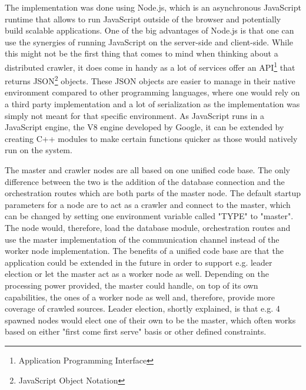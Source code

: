 The implementation was done using Node.js, which is an asynchronous JavaScript runtime that allows to run JavaScript outside of the browser and potentially build scalable applications. One of the big advantages of Node.js is that one can use the synergies of running JavaScript on the server-side and client-side. While this might not be the first thing that comes to mind when thinking about a distributed crawler, it does come in handy as a lot of services offer an API\footnote{Application Programming Interface} that returns JSON\footnote{JavaScript Object Notation} objects. These JSON objects are easier to manage in their native environment compared to other programming languages, where one would rely on a third party implementation and a lot of serialization as the implementation was simply not meant for that specific environment.
As JavaScript runs in a JavaScript engine, the V8 engine developed by Google, it can be extended by creating C++ modules to make certain functions quicker as those would natively run on the system.

The master and crawler nodes are all based on one unified code base. The only difference between the two is the addition of the database connection and the orchestration routes which are both parts of the master node. The default startup parameters for a node are to act as a crawler and connect to the master, which can be changed by setting one environment variable called "TYPE" to "master". The node would, therefore, load the database module, orchestration routes and use the master implementation of the communication channel instead of the worker node implementation.
The benefits of a unified code base are that the application could be extended in the future in order to support e.g. leader election or let the master act as a worker node as well. Depending on the processing power provided, the master could handle, on top of its own capabilities, the ones of a worker node as well and, therefore, provide more coverage of crawled sources.
Leader election, shortly explained, is that e.g. 4 spawned nodes would elect one of their own to be the master, which often works based on either "first come first serve" basis or other defined constraints.

